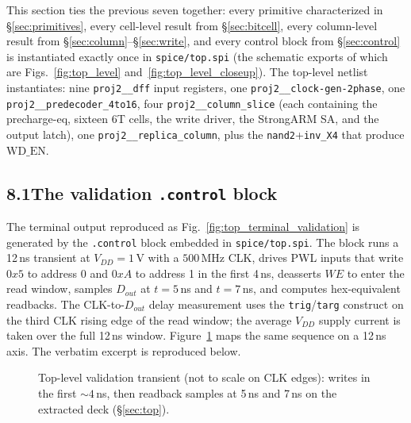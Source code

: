 \documentclass[11pt]{article}
\newcommand{\Subsect}[1]{\subsection*{#1}\addcontentsline{toc}{subsection}{#1}}
\begin{document}
This section ties the previous seven together: every primitive
characterized in \S\ref{sec:primitives}, every cell-level result from
\S\ref{sec:bitcell}, every column-level result from
\S\ref{sec:column}--\S\ref{sec:write}, and every control block from
\S\ref{sec:control} is instantiated exactly once in
\texttt{spice/top.spi} (the schematic exports of which are
Figs.~\ref{fig:top_level} and~\ref{fig:top_level_closeup}). The
top-level netlist instantiates: nine \texttt{proj2\_\_dff} input
registers, one \texttt{proj2\_\_clock-gen-2phase}, one
\texttt{proj2\_\_predecoder\_4to16}, four \texttt{proj2\_\_column\_slice}
(each containing the precharge-eq, sixteen 6T cells, the write driver,
the StrongARM SA, and the output latch), one \texttt{proj2\_\_replica\_column},
plus the \texttt{nand2}+\texttt{inv\_X4} that produce $\mathrm{WD\_EN}$.

\Subsect{8.1\quad The validation \texttt{.control} block}

The terminal output reproduced as
Fig.~\ref{fig:top_terminal_validation} is generated by the
\texttt{.control} block embedded in \texttt{spice/top.spi}. The block
runs a 12\,ns transient at $V_{DD}=1\,$V with a $500\,$MHz CLK, drives
PWL inputs that write $0x5$ to address 0 and $0xA$ to address 1 in
the first 4\,ns, deasserts $WE$ to enter the read window, samples
$D_{out}$ at $t=5\,$ns and $t=7\,$ns, and computes hex-equivalent
readbacks. The CLK-to-$D_{out}$ delay measurement uses the
\texttt{trig}/\texttt{targ} construct on the third CLK rising edge of
the read window; the average $V_{DD}$ supply current is taken over the
full 12\,ns window. Figure~\ref{fig:validation_timeline} maps the same
sequence on a 12\,ns axis. The verbatim excerpt is reproduced below.

\begin{figure}[H]
\centering
{}
\caption{Top-level validation transient (not to scale on CLK edges):
writes in the first $\sim\!4$\,ns, then readback samples at 5\,ns and
7\,ns on the extracted deck (\S\ref{sec:top}).}
\label{fig:validation_timeline}
\end{figure}
\end{document}
